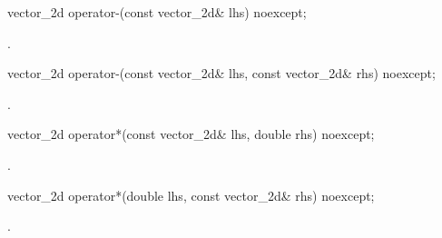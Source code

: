 \begin{itemdecl}
vector_2d operator-(const vector_2d& lhs) noexcept;
\end{itemdecl}
\begin{itemdescr}
	\pnum
	\returns
	.
\end{itemdescr}

\begin{itemdecl}
vector_2d operator-(const vector_2d& lhs, const vector_2d& rhs) noexcept;
\end{itemdecl}
\begin{itemdescr}
	\pnum
	\returns
	.
\end{itemdescr}

\begin{itemdecl}
vector_2d operator*(const vector_2d& lhs, double rhs) noexcept;
\end{itemdecl}
\begin{itemdescr}
	\pnum
	\returns
	.
\end{itemdescr}

\begin{itemdecl}
vector_2d operator*(double lhs, const vector_2d& rhs) noexcept;
\end{itemdecl}
\begin{itemdescr}
	\pnum
	\returns
	.
\end{itemdescr}
